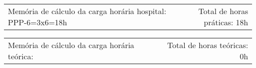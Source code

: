 {\fontsize{10pt}{12pt}\selectfont
\noindent
\begin{tabularx}{\linewidth}{@{}X r@{}}
Memória de cálculo da carga horária hospital:
PPP-6=3x6=18h&
Total de horas práticas: 18h\\
\end{tabularx}
\noindent
\begin{tabularx}{\linewidth}{@{}X r@{}}
Memória de cálculo da carga horária teórica: 
 &
Total de horas teóricas: 0h
\end{tabularx}
}